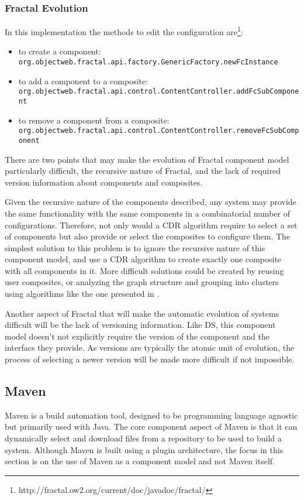 \subsubsection{Fractal Evolution}
In this implementation the methods to edit the configuration are\footnote{http://fractal.ow2.org/current/doc/javadoc/fractal/}:
\begin{itemize}
  \item to create a component: \verb+org.objectweb.fractal.api.factory.GenericFactory.newFcInstance+
  \item to add a component to a composite: \verb+org.objectweb.fractal.api.control.ContentController.addFcSubComponent+
  \item to remove a component from a composite: \verb+org.objectweb.fractal.api.control.ContentController.removeFcSubComponent+
\end{itemize}

There are two points that may make the evolution of Fractal component model particularly difficult,
the recursive nature of Fractal, and the lack of required version information about components and composites.

Given the recursive nature of the components described, any system may provide the same functionality with the same components in a combinatorial number of configurations.
Therefore, not only would a CDR algorithm require to select a set of components but also provide or select the composites to configure them.
The simplest solution to this problem is to ignore the recursive nature of this component model,
and use a CDR algorithm to create exactly one composite with all components in it.
More difficult solutions could be created by reusing user composites, or analyzing the graph structure and grouping into clusters using algorithms like the one presented in \cite{dietrich2008cluster}.

Another aspect of Fractal that will make the automatic evolution of systems difficult will be the lack of versioning information.
Like DS, this component model doesn't not explicitly require the version of the component and the interfacs they provide.
As versions are typically the atomic unit of evolution, the process of selecting a newer version will be made more difficult if not impossible. 

\subsection{Maven}
Maven is a build automation tool, designed to be programming language agnostic but primarily used with Java.
The core component aspect of Maven is that it can dynamically select and download files from a repository to be used to build a system.
Although Maven is built using a plugin architecture, the focus in this section is on the use of Maven as a component model and not Maven itself.

